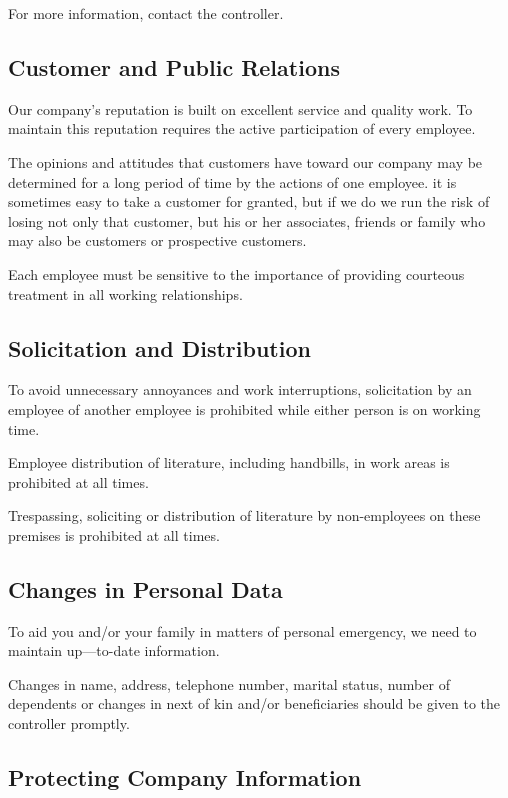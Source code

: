 For more information, contact the controller.

\subsection{Customer and Public Relations}

Our company's reputation is built on excellent service and quality work. To maintain this reputation requires the active participation of every employee.

The opinions and attitudes that customers have toward our company may be determined for a long period of time by the actions of one employee. it is sometimes easy to take a customer for granted, but if we do we run the risk of losing not only that customer, but his or her associates, friends or family who may also be customers or prospective customers.

Each employee must be sensitive to the importance of providing courteous treatment in all working relationships.

\subsection{Solicitation and Distribution}

To avoid unnecessary annoyances and work interruptions, solicitation by an employee of another employee is prohibited while either person is on working time.

Employee distribution of literature, including handbills, in work areas is prohibited at all times.

Trespassing, soliciting or distribution of literature by non-employees on these premises is prohibited at all times.

\subsection{Changes in Personal Data}

To aid you and/or your family in matters of personal emergency, we need to maintain up—to-date information.

Changes in name, address, telephone number, marital status, number of dependents or changes in next of kin and/or beneficiaries should be given to the controller promptly.

\subsection{Protecting Company Information}

